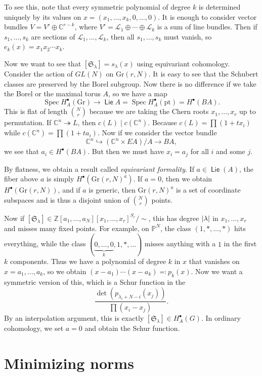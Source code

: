 \documentclass[leqno, openany]{memoir}
\theoremstyle{definition}
\theoremstyle{remark}
\theoremstyle{plain}
\theoremstyle{definition}
\theoremstyle{remark}
\newcommand{\C}{\mathbb{C}}
\newcommand{\Z}{\mathbb{Z}}
\renewcommand{\P}{\mathbb{P}}
\newcommand{\mc}[1]{\mathcal{#1}}
\newcommand{\mf}[1]{\mathfrak{#1}}
\newcommand{\mr}[1]{\mathrm{#1}}
\DeclareMathOperator{\Spec}{Spec}
\DeclareMathOperator{\Lie}{\mathsf{Lie}}
\begin{document}
To see this, note that every symmetric polynomial of degree $k$ is determined
uniquely by its values on $x = (x_1, \ldots, x_k, 0, \ldots, 0)$. It is enough
to consider vector bundles $V = V' \oplus \C^{r-k}$, where $V' = \mc{L}_1
\oplus \cdots \oplus \mc{L}_k$ is a sum of line bundles. Then if $s_1, \ldots,
s_k$ are sections of $\mc{L}_1, \ldots, \mc{L}_k$, then all $s_1, \ldots, s_k$
must vanish, so $e_k(x) = x_1 x_2 \cdots x_k$.

Now we want to see that $[\mf{S}_{\lambda}] = s_{\lambda}(x)$ using equivariant
cohomology. Consider the action of $GL(N)$ on $\mr{Gr}(r, N)$. It is easy to
see that the Schubert classes are preserved by the Borel subgroup. Now there is
no difference if we take the Borel or the maximal torus $A$, so we have a map
\[ \Spec H_A^{\bullet}(\mr{Gr}) \to \Lie A = \Spec H_A^{\bullet}(\mr{pt}) =
H^{\bullet}(BA). \] This is flat of length $\binom{N}{r}$ because we are taking
the Chern roots $x_1, \ldots, x_r$ up to permutation. If $\C^n
\twoheadrightarrow L$, then $c(L) \mid c(\C^n)$. Because $c(L) = \prod (1+t
x_i)$ while $c(\C^n) = \prod (1+t a_i)$. Now if we consider the vector bundle
\[ \C^n \hookrightarrow (\C^n \times EA)/A \to BA ,\] we see that $a_i \in
H^{\bullet}(BA)$. But then we must have $x_i = a_j$ for all $i$ and some $j$.

By flatness, we obtain a result called \textit{equivariant formality}. If $a
\in \Lie(A)$, the fiber above $a$ is simply $H^{\bullet}({\mr{Gr}(r, N)}^a)$.
If $a = 0$, then we obtain $H^{\bullet}(\mr{Gr}(r, N))$, and if $a$ is generic,
then ${\mr{Gr}(r, N)}^a$ is a set of coordinate subspaces and is thus a
disjoint union of $\binom{N}{r}$ points. 

Now if $[\mf{S}_{\lambda}] \in { \Z[a_1, \ldots, a_N][x_1, \ldots, x_r] }^{S_r}
/ \sim$, this has degree $\abs{\lambda}$ in $x_1, \ldots, x_r$ and misses many
fixed points. For example, on $\P^N$, the class $(1,*,\ldots, *)$ hits
everything, while the class $(\underbrace{0, \ldots, 0}_k, 1, *, \ldots)$
misses anything with a $1$ in the first $k$ components. Thus we have a
polynomial of degree $k$ in $x$ that vanishes on $x = a_1, \ldots, a_k$, so we
obtain $(x - a_1) \cdots (x-a_k) \eqqcolon p_k(x)$. Now we want a symmetric
version of this, which is a Schur function in the \[ \frac{\det (p_{\lambda_i +
N - i}(x_j))}{\prod (x_i - x_j)}. \] By an interpolation argument, this is
exactly $[\mf{S}_{\lambda}] \in H_A^{\bullet}(G)$. In ordinary cohomology, we
set $a = 0$ and obtain the Schur function.

\section{Minimizing norms}%
\end{document}
